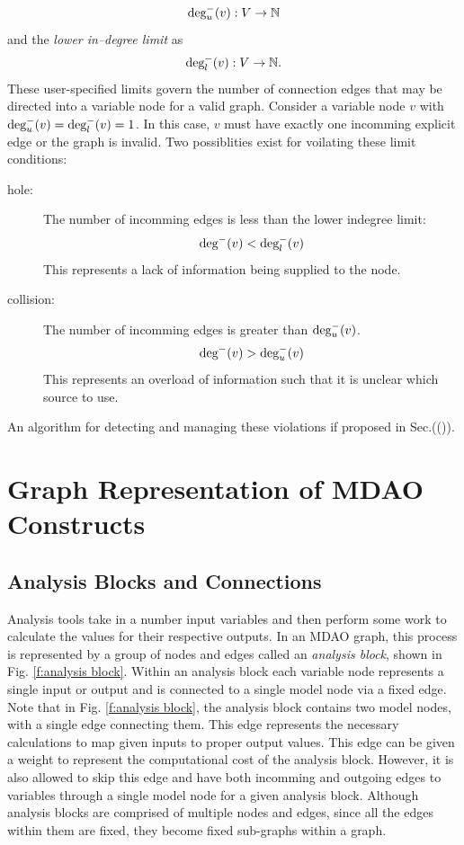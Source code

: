 \begin{equation}
\textrm{deg}_u^-(v):V \to \mathbb{N}
\end{equation} 
and the \emph{lower in--degree limit} as
\begin{equation}
\textrm{deg}_l^-(v):V \to \mathbb{N}.
\end{equation}
These user-specified limits govern the number of connection edges that may be directed into a variable
node for a valid graph. Consider a variable node $v$ with
$\textrm{deg}_u^-(v) = \textrm{deg}_l^-(v) = 1$. In this case, $v$ must have exactly one
incomming explicit edge or the graph is invalid. Two possiblities exist for voilating 
these limit conditions: 
\begin{description}
  \item[hole: ] The number of incomming edges is less than the lower indegree limit:
    \begin{equation} \textrm{deg}^-(v) < \textrm{deg}_l^-(v) \label{e:hole} \end{equation}
	This represents a lack of information being supplied to the node.

  \item[collision: ] The number of incomming edges is greater than $ \textrm{deg}_u^-(v)$. 
    \begin{equation} \textrm{deg}^-(v) > \textrm{deg}_u^-(v) \end{equation}
	This represents an overload of information such that it is unclear which source to use.
\end{description} 
An algorithm for detecting and managing these violations if proposed in Sec.(()).

\section{Graph Representation of MDAO Constructs}
\subsection{Analysis Blocks and Connections}
Analysis tools take in a number input variables and then perform some work to calculate 
the values for their respective outputs. In an MDAO graph, this process is 
represented by a group of nodes and edges called an \emph{analysis block}, 
shown in Fig. \ref{f:analysis block}. Within an analysis block each variable 
node represents a single input or output and is connected 
to a single model node via a fixed edge. Note that in Fig. \ref{f:analysis block}, 
the analysis block contains two model nodes, with a single edge connecting them. 
This edge represents the necessary calculations to map given inputs 
to proper output values. This edge can be given a weight to represent the computational cost of the analysis block. However, it is also allowed to skip 
this edge and have both incomming and outgoing edges to variables through a single model 
node for a given analysis block. Although analysis blocks are comprised of multiple nodes and edges, since all 
the edges within them are fixed, they become fixed sub-graphs within a graph.

